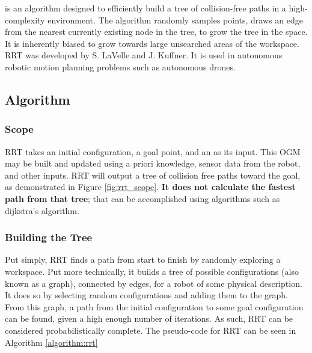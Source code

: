 
 is an algorithm designed to efficiently build a tree of collision-free paths in a high-complexity environment. The algorithm randomly samples points, draws an edge from the nearest currently existing node in the tree, to grow the tree in the space. It is inherently biased to grow towards large unsearched areas of the workspace. RRT was developed by S. LaVelle\cite{LaValle1998} and J. Kuffner\cite{LaValle2001}. It is used in autonomous robotic motion planning problems such as autonomous drones.

\subsection{Algorithm}

    \subsubsection{Scope}
        \gls{RRT} takes an initial configuration, a goal point, and an  as its input. This \gls{OGM} may be built and updated using \gls{a priori} knowledge, sensor data from the robot, and other inputs. \gls{RRT} will output a tree of collision free paths toward the goal, as demonstrated in Figure \ref{fig:rrt_scope}. \textbf{It does not calculate the fastest path from that tree}; that can be accomplished using algorithms such as \Gls{dijkstra's algorithm}.

        

    \subsubsection{Building the Tree}

        Put simply, \gls{RRT} finds a path from start to finish by randomly exploring a workspace.
        Put more technically, it builds a tree of possible \glspl{configuration} (also known as a graph), connected by edges, for a robot of some physical description. It does so by selecting random \glspl{configuration} and adding them to the graph. 
        From this graph, a path from the initial \gls{configuration} to some goal \gls{configuration} can be found, given a high enough number of iterations. As such, \gls{RRT} can be considered \gls{probabilistically complete}.
        The pseudo-code for \gls{RRT} can be seen in Algorithm \ref{algorithm:rrt}
        

